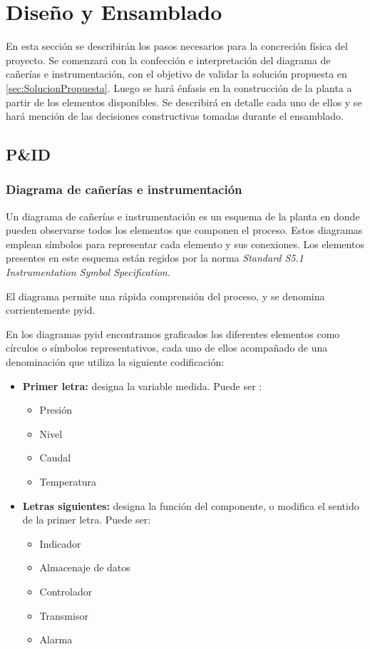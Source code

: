 \chapter{Diseño y Ensamblado}
\label{ch:DisenoEnsamblado}

En esta sección se describirán los pasos necesarios para la concreción física
del proyecto.
Se comenzará con la confección e interpretación del diagrama de cañerías e
instrumentación, con el objetivo de validar la solución propuesta en
\ref{sec:SolucionPropuesta}.
Luego se hará énfasis en la construcción de la planta a partir de los elementos
disponibles.
Se describirá en detalle cada uno de ellos y se hará mención de
las decisiones constructivas tomadas durante el ensamblado.

\section{P\&ID}
\label{sec:p&id}

\subsection{Diagrama de cañerías e instrumentación}
Un diagrama de cañerías e instrumentación es un esquema de la planta en donde
pueden observarse todos los elementos que componen el proceso.
Estos diagramas emplean símbolos para representar cada elemento y sus
conexiones.
Los elementos presentes en este esquema están regidos por la norma
\emph{Standard S5.1 Instrumentation Symbol Specification}.

El diagrama permite una rápida comprensión del proceso, y se denomina
corrientemente \gls{pyid}.

En los diagramas \gls{pyid} encontramos graficados los diferentes elementos
como círculos o símbolos representativos, cada uno de ellos acompañado de una
denominación que utiliza la siguiente codificación:

\begin{itemize}  
 \item \textbf{Primer letra:}
 designa la variable medida. Puede ser :
 \begin{itemize}
  \item Presión
  \item Nivel
  \item Caudal
  \item Temperatura
 \end{itemize}

 \item \textbf{Letras siguientes:}
 designa la función del componente, o modifica el sentido de la primer letra.
 Puede ser:
 \begin{itemize}
  \item Indicador
  \item Almacenaje de datos
  \item Controlador
  \item Transmisor
  \item Alarma
 \end{itemize}
\end{itemize}

